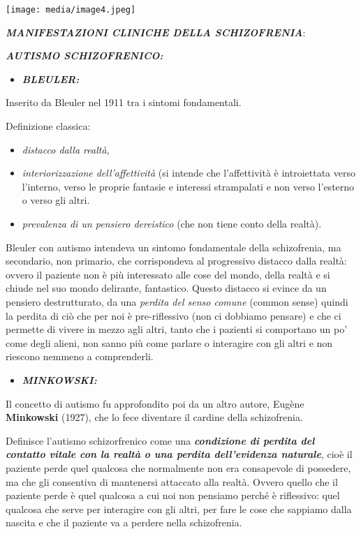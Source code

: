 \documentclass[]{article}
\begin{document}
\texttt{[image: media/image4.jpeg]}

\textbf{\emph{MANIFESTAZIONI CLINICHE DELLA SCHIZOFRENIA}}:

\textbf{\emph{AUTISMO SCHIZOFRENICO:}}

\begin{itemize}
\item
  \textbf{\emph{BLEULER:}}
\end{itemize}

Inserito da Bleuler nel 1911 tra i sintomi fondamentali.

Definizione classica:

\begin{itemize}
\item
  \emph{distacco dalla realtà,}
\item
  \emph{interiorizzazione dell'affettività} (si intende che
  l'affettività è introiettata verso l'interno, verso le proprie
  fantasie e interessi strampalati e non verso l'esterno o verso gli
  altri.
\item
  \emph{prevalenza di un pensiero dereistico} (che non tiene conto della
  realtà).
\end{itemize}

Bleuler con autismo intendeva un sintomo fondamentale della
schizofrenia, ma secondario, non primario, che corrispondeva al
progressivo distacco dalla realtà: ovvero il paziente non è più
interessato alle cose del mondo, della realtà e si chiude nel suo mondo
delirante, fantastico. Questo distacco si evince da un pensiero
destrutturato, da una \emph{perdita del senso comune} (common sense)
quindi la perdita di ciò che per noi è pre-riflessivo (non ci dobbiamo
pensare) e che ci permette di vivere in mezzo agli altri, tanto che i
pazienti si comportano un po' come degli alieni, non sanno più come
parlare o interagire con gli altri e non riescono nemmeno a
comprenderli.

\begin{itemize}
\item
  \textbf{\emph{MINKOWSKI:}}
\end{itemize}

Il concetto di autismo fu approfondito poi da un altro autore, Eugène
\textbf{Minkowski} (1927), che lo fece diventare il cardine della
schizofrenia.

Definisce l'autismo schizorfrenico come una \textbf{\emph{condizione di
perdita del contatto vitale con la realtà o una perdita dell'evidenza
naturale}}, cioè il paziente perde quel qualcosa che normalmente non era
consapevole di possedere, ma che gli consentiva di mantenersi attaccato
alla realtà. Ovvero quello che il paziente perde è quel qualcosa a cui
noi non pensiamo perché è riflessivo: quel qualcosa che serve per
interagire con gli altri, per fare le cose che sappiamo dalla nascita e
che il paziente va a perdere nella schizofrenia.
\end{document}
